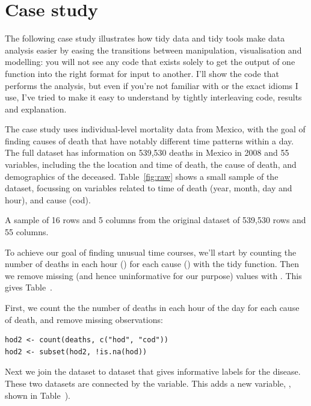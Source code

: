 \documentclass[article]{jss}
\begin{document}
\section{Case study} 
\label{sec:case-study}

The following case study illustrates how tidy data and tidy tools make data analysis easier by easing the transitions between manipulation, visualisation and modelling: you will not see any code that exists solely to get the output of one function into the right format for input to another. I'll show the  code that performs the analysis, but even if you're not familiar with  or the exact idioms I use, I've tried to make it easy to understand by tightly interleaving code, results and explanation.

The case study uses individual-level mortality data from Mexico, with the goal of finding causes of death that have notably different time patterns within a day. The full dataset has information on 539,530 deaths in Mexico in 2008 and 55 variables, including the the location and time of death, the cause of death, and demographics of the deceased. Table~\ref{fig:raw} shows a small sample of the dataset, focussing on variables related to time of death (year, month, day and hour), and cause (cod).

\begin{table}
  \centering
  
  \caption{A sample of 16 rows and 5 columns from the original dataset of 539,530 rows and 55 columns.}
  \label{fig:raw}
\end{table}

To achieve our goal of finding unusual time courses, we'll start by counting the number of deaths in each hour () for each cause () with the tidy  function. Then we remove missing (and hence uninformative for our purpose) values with . This gives Table~.

First, we count the the number of deaths in each hour of the day for each cause of death, and remove missing observations:

\begin{Verbatim}
hod2 <- count(deaths, c("hod", "cod"))
hod2 <- subset(hod2, !is.na(hod))
\end{Verbatim}

Next we join the dataset to  dataset that gives informative labels for the disease. These two datasets are connected by the  variable. This adds a new variable, , shown in Table~).
\end{document}
